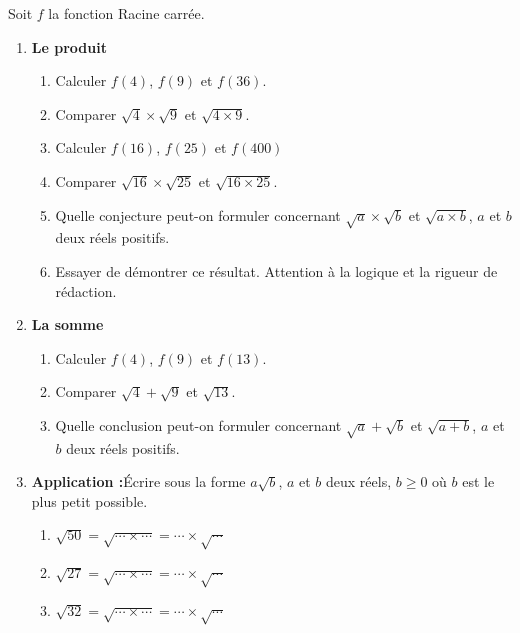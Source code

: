 
Soit $f$ la fonction Racine carrée.

\begin{enumerate}
\item \textbf{Le produit}
\begin{enumerate}
\item Calculer $f(4)$, $f(9)$ et $f(36)$.
\item Comparer $\sqrt{4} \times \sqrt{9}$ et $\sqrt{4 \times 9}$.
\item Calculer $f(16)$, $f(25)$ et $f(400)$
\item Comparer $\sqrt{16} \times \sqrt{25}$ et $\sqrt{16 \times 25}$.
\item Quelle conjecture peut-on formuler concernant $\sqrt{a} \times \sqrt{b}$ et $\sqrt{a \times b}$, $a$ et $b$ deux réels positifs. 
\item Essayer de démontrer ce résultat. Attention à la logique et la rigueur de rédaction.
\end{enumerate}
\item \textbf{La somme}
\begin{enumerate}
\item Calculer $f(4)$, $f(9)$ et $f(13)$.
\item Comparer $\sqrt{4} + \sqrt{9}$ et $\sqrt{13}$.
\item Quelle conclusion peut-on formuler concernant $\sqrt{a} + \sqrt{b}$ et $\sqrt{a+b}$, $a$ et $b$ deux réels positifs. 
\end{enumerate}
\item \textbf{Application :}Écrire sous la forme $a\sqrt{b}$, $a$ et $b$ deux réels, $b \geq 0$ où $b$ est le plus petit possible.
\begin{enumerate}
\item $\sqrt{50}=\sqrt{\cdots \times \cdots}=\cdots \times\sqrt{ \cdots}$
\item $\sqrt{27}=\sqrt{\cdots \times \cdots}=\cdots \times\sqrt{ \cdots}$
\item $\sqrt{32}=\sqrt{\cdots \times \cdots}=\cdots \times\sqrt{ \cdots}$
\end{enumerate}
\end{enumerate}